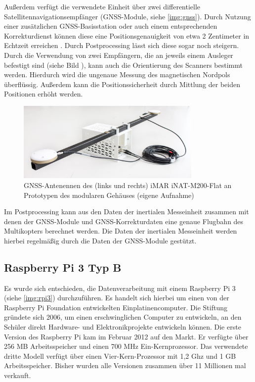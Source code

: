\documentclass[a4paper,12pt,bibliography=totoc, listof=totoc,titlepage,pointlessnumbers]{scrreprt}
\begin{document}
Außerdem verfügt die verwendete Einheit über zwei differentielle Satellitennavigationsempfänger (GNSS-Module, siehe \autoref{img:gnss}). Durch Nutzung einer zusätzlichen GNSS-Basisstation oder auch einem entsprechenden Korrekturdienst können diese eine Positionsgenauigkeit von etwa 2 Zentimeter in Echtzeit erreichen \citep{imar}. Durch Postprocessing lässt sich diese sogar noch steigern. \citet{wilken}  Durch die Verwendung von zwei Empfängern, die an jeweils einem Ausleger befestigt sind (siehe Bild ), kann auch die Orientierung des Scanners bestimmt werden. Hierdurch wird die ungenaue Messung des magnetischen Nordpols überflüssig. Außerdem kann die Positionssicherheit durch Mittlung der beiden Positionen erhöht werden.

\begin{figure}
 \centering
 \includegraphics[width=0.8\textwidth]{./img/gnss.jpg}
 \caption{GNSS-Antenennen des (links und rechts) iMAR iNAT-M200-Flat an Prototypen des modularen Gehäuses (eigene Aufnahme)}
 \label{img:gnss}
\end{figure}

Im Postprocessing kann aus den Daten der inertialen Messeinheit zusammen mit denen der GNSS-Module und GNSS-Korrekturdaten eine genaue Flugbahn des Multikopters berechnet werden. Die Daten der inertialen Messeinheit werden hierbei regelmäßig durch die Daten der GNSS-Module gestützt.

\subsection{Raspberry Pi 3 Typ B}
\label{ss:Raspberry}
Es wurde sich entschieden, die Datenverarbeitung mit einem Raspberry Pi 3 (siehe \autoref{img:rpi3}) durchzuführen. Es handelt sich hierbei um einen von der Raspberry Pi Foundation entwickelten Einplatinencomputer. Die Stiftung gründete sich 2006, um einen erschwinglichen Computer zu entwickeln, an den Schüler direkt Hardware- und Elektronikprojekte entwickeln können. Die erste Version des Raspberry Pi kam im Februar 2012 auf den Markt. Er verfügte über 256 MB Arbeitsspeicher und einen 700 MHz Ein-Kernprozessor. Das verwendete dritte Modell verfügt über einen Vier-Kern-Prozessor mit 1,2 Ghz und 1 GB Arbeitsspeicher. Bisher wurden alle Versionen zusammen über 11 Millionen mal verkauft. \citep{heise5Rasp}
\end{document}
